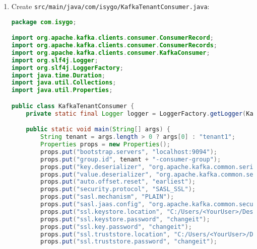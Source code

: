\documentclass[12pt,a4paper]{report}
\begin{document}
\begin{enumerate}
\begin{lstlisting}[language=java]
        try (KafkaProducer<String, String> producer = new KafkaProducer<>(props)) {
            for (int i = 1; i <= 5; i++) {
                ProducerRecord<String, String> record = new ProducerRecord<>(tenant + ".orders", "order" + i, tenant + " Order data " + i);
                producer.send(record, (metadata, exception) -> {
                    if (exception != null) {
                        logger.error("Error sending: {}", exception.getMessage());
                    } else {
                        logger.info("Sent to {}.orders: key=order{}, partition={}, offset={}", tenant, i, metadata.partition(), metadata.offset());
                    }
                });
            }
            producer.flush();
        } catch (Exception e) {
            logger.error("Producer error: {}", e.getMessage());
        }
    }
}
\end{lstlisting}
    \item Create \texttt{src/main/java/com/isygo/KafkaTenantConsumer.java}:
\begin{lstlisting}[language=java]
package com.isygo;

import org.apache.kafka.clients.consumer.ConsumerRecord;
import org.apache.kafka.clients.consumer.ConsumerRecords;
import org.apache.kafka.clients.consumer.KafkaConsumer;
import org.slf4j.Logger;
import org.slf4j.LoggerFactory;
import java.time.Duration;
import java.util.Collections;
import java.util.Properties;

public class KafkaTenantConsumer {
    private static final Logger logger = LoggerFactory.getLogger(KafkaTenantConsumer.class);

    public static void main(String[] args) {
        String tenant = args.length > 0 ? args[0] : "tenant1";
        Properties props = new Properties();
        props.put("bootstrap.servers", "localhost:9094");
        props.put("group.id", tenant + "-consumer-group");
        props.put("key.deserializer", "org.apache.kafka.common.serialization.StringDeserializer");
        props.put("value.deserializer", "org.apache.kafka.common.serialization.StringDeserializer");
        props.put("auto.offset.reset", "earliest");
        props.put("security.protocol", "SASL_SSL");
        props.put("sasl.mechanism", "PLAIN");
        props.put("sasl.jaas.config", "org.apache.kafka.common.security.plain.PlainLoginModule required username=\"" + tenant + "\" password=\"" + tenant + "-secret\";");
        props.put("ssl.keystore.location", "C:/Users/<YourUser>/Desktop/w1d1-lab/certs/kafka.keystore.jks");
        props.put("ssl.keystore.password", "changeit");
        props.put("ssl.key.password", "changeit");
        props.put("ssl.truststore.location", "C:/Users/<YourUser>/Desktop/w1d1-lab/certs/kafka.truststore.jks");
        props.put("ssl.truststore.password", "changeit");


\end{lstlisting}
\end{enumerate}
\end{document}
